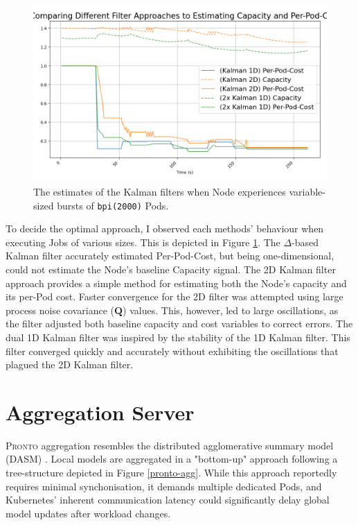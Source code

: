 \begin{figure}[H]
    \centering
    \includegraphics[width=\textwidth]{images/filter-comparison.png}
    \caption{The estimates of the Kalman filters when Node experiences
    variable-sized bursts of \texttt{bpi(2000)} Pods.}
    \label{fig:filter-evaluation}
\end{figure}
To decide the optimal approach, I observed each methods' behaviour when
executing Jobs of various sizes. This is depicted in Figure
\ref{fig:filter-evaluation}.
The $\Delta$-based Kalman filter accurately estimated Per-Pod-Cost, but being
one-dimensional, could not estimate the Node's baseline Capacity signal. The 2D
Kalman filter approach provides a simple method for estimating both the Node's
capacity and its per-Pod cost. Faster convergence for the 2D filter was
attempted using large process noise covariance ($\mathbf{Q}$) values. This, however,
led to large oscillations, as the filter adjusted both baseline capacity and
cost variables to correct errors. The dual 1D Kalman filter was inspired by the
stability of the 1D Kalman filter. This filter converged quickly and accurately
without exhibiting the oscillations that plagued the 2D Kalman filter.

\section{Aggregation Server}
\textsc{Pronto} aggregation resembles the distributed agglomerative summary
model (DASM) \cite{}. Local models are aggregated in a "bottom-up" approach
following a tree-structure depicted in Figure \ref{pronto-agg}. While this
approach reportedly requires minimal synchonisation, it demands
multiple dedicated Pods, and Kubernetes' inherent communication latency could
significantly delay global model updates after workload changes.

